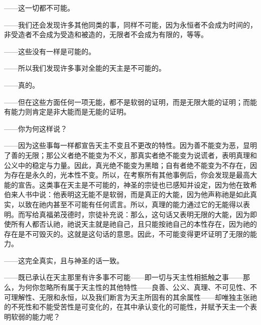 ——这一切都不可能。\par

——我们还会发现许多其他同类的事，同样不可能，因为永恒者不会成为时间的，非受造者不会成为受造和被造的，无限者不会成为有限的，等等。\par

——这些没有一样是可能的。\par

——所以我们发现许多事对全能的天主是不可能的。\par

——真的。\par

——但在这些方面任何一项无能，都不是软弱的证明，而是无限大能的证明；而能有能力则肯定是非大能而是无能的证明。\par

——你为何这样说？\par

——因为这些事每一样都宣告天主不变且不更改的特性。因为善不能变为恶，显明了善的无限；那公义者绝不能变为不义，那真实者绝不能变为说谎者，表明真理和公义中的稳定与力量。因此，真光绝不能变为黑暗；自有者绝不能变为不存在，因为存在是永久的，光本性不变。所以，在考察所有其他事例后，你会发现是最高大能的宣告。这类事在天主是不可能的，神圣的宗徒也已感知并设定，因为他在致希伯来人书中说：他表明这无能不是软弱，而是真正的大能，因为他声称祂是如此真实，以致在祂内甚至不可能有任何谎言。所以，真理的能力通过它的无能得以表明。而写给真福弟茂德时，宗徒补充说：那么，这句话又表明无限的大能，因为即使所有人都否认祂，祂说天主就是祂自己，且只能按祂自己的本性存在，因为祂的存在是不可毁灭的。这就是这句话的意思。因此，不可能变得更坏证明了无限的能力。\par

——这完全真实，且与神圣的话一致。\par

——既已承认在天主那里有许多事不可能——即一切与天主性相抵触之事——那么，为何你忽略所有属于天主性的其他特性——良善、公义、真理、不可见性、不可理解性、无限和永恒，以及我们断言为天主所固有的其余属性——却唯独主张祂的不死性和不能受苦性是可变化的，在其中承认变化的可能性，并赋予天主一个表明软弱的能力呢？\par

